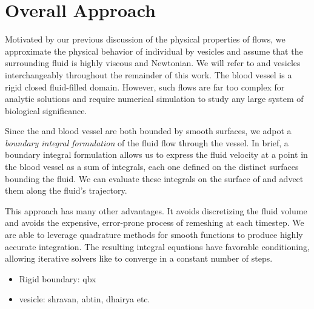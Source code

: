 \section{Overall Approach}
Motivated by our previous discussion of the physical properties of \rbc flows, we approximate the physical behavior of individual \rbcs by vesicles and assume that the surrounding fluid is highly viscous and Newtonian.
We will refer to \rbcs and vesicles interchangeably throughout the remainder of this work.
The blood vessel is a rigid closed fluid-filled domain. 
However, such flows are far too complex for analytic solutions and require numerical simulation to study any large system of biological significance.

Since the \rbcs and blood vessel are both bounded by smooth surfaces, we adpot a \textit{boundary integral formulation} of the fluid flow through the vessel.
In brief, a boundary integral formulation allows us to express the fluid velocity at a point in the blood vessel as a sum of integrals, each one defined on the distinct surfaces bounding the fluid.
We can evaluate these integrals on the surface of \rbcs and advect them along the fluid's trajectory. 

This approach has many other advantages. 
It avoids discretizing the fluid volume and avoids the expensive, error-prone process of remeshing at each timestep.
We are able to leverage quadrature methods for smooth functions to produce highly accurate integration.
The resulting integral equations have favorable conditioning, allowing iterative solvers like \gmres to converge in a constant number of steps.



\begin{itemize}
    \item Rigid boundary: qbx
    \item vesicle: shravan, abtin, dhairya etc.
\end{itemize}

